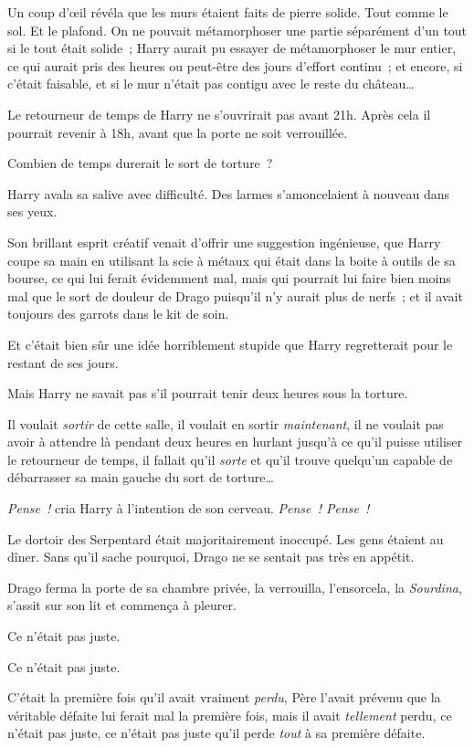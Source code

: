 Un coup d'œil révéla que les murs étaient faits de pierre solide.
Tout comme le sol.
Et le plafond.
On ne pouvait métamorphoser une partie séparément d'un tout si le tout était solide~; Harry aurait pu essayer de métamorphoser le mur entier, ce qui aurait pris des heures ou peut-être des jours d'effort continu~; et encore, si c'était faisable, et si le mur n'était pas contigu avec le reste du château…

Le retourneur de temps de Harry ne s'ouvrirait pas avant 21h.
Après cela il pourrait revenir à 18h, avant que la porte ne soit verrouillée.

Combien de temps durerait le sort de torture~?

Harry avala sa salive avec difficulté.
Des larmes s'amoncelaient à nouveau dans ses yeux.

Son brillant esprit créatif venait d'offrir une suggestion ingénieuse, que Harry coupe sa main en utilisant la scie à métaux qui était dans la boite à outils de sa bourse, ce qui lui ferait évidemment mal, mais qui pourrait lui faire bien moins mal que le sort de douleur de Drago puisqu'il n'y aurait plus de nerfs~; et il avait toujours des garrots dans le kit de soin.

Et c'était bien sûr une idée horriblement stupide que Harry regretterait pour le restant de ses jours.

Mais Harry ne savait pas s'il pourrait tenir deux heures sous la torture.

Il voulait \emph{sortir} de cette salle, il voulait en sortir \emph{maintenant}, il ne voulait pas avoir à attendre là pendant deux heures en hurlant jusqu'à ce qu'il puisse utiliser le retourneur de temps, il fallait qu'il \emph{sorte} et qu'il trouve quelqu'un capable de débarrasser sa main gauche du sort de torture…

\emph{Pense~!} cria Harry à l'intention de son cerveau.
\emph{Pense~!
Pense~!}

\later

Le dortoir des Serpentard était majoritairement inoccupé.
Les gens étaient au dîner.
Sans qu'il sache pourquoi, Drago ne se sentait pas très en appétit.

Drago ferma la porte de sa chambre privée, la verrouilla, l'ensorcela, la \emph{Sourdina}, s'assit sur son lit et commença à pleurer.

Ce n'était pas juste.

Ce n'était pas juste.

C'était la première fois qu'il avait vraiment \emph{perdu}, Père l'avait prévenu que la véritable défaite lui ferait mal la première fois, mais il avait \emph{tellement} perdu, ce n'était pas juste, ce n'était pas juste qu'il perde \emph{tout} à sa première défaite.

